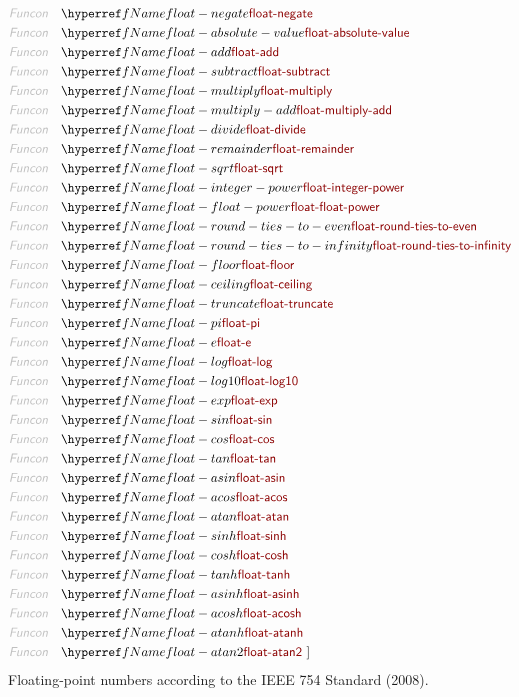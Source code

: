 \begin{align*}
  \KEY{Funcon} \quad & \NAMEREF{float-negate} \\
  \KEY{Funcon} \quad & \NAMEREF{float-absolute-value} \\
  \KEY{Funcon} \quad & \NAMEREF{float-add} \\
  \KEY{Funcon} \quad & \NAMEREF{float-subtract} \\
  \KEY{Funcon} \quad & \NAMEREF{float-multiply} \\
  \KEY{Funcon} \quad & \NAMEREF{float-multiply-add} \\
  \KEY{Funcon} \quad & \NAMEREF{float-divide} \\
  \KEY{Funcon} \quad & \NAMEREF{float-remainder} \\
  \KEY{Funcon} \quad & \NAMEREF{float-sqrt} \\
  \KEY{Funcon} \quad & \NAMEREF{float-integer-power} \\
  \KEY{Funcon} \quad & \NAMEREF{float-float-power} \\
  \KEY{Funcon} \quad & \NAMEREF{float-round-ties-to-even} \\
  \KEY{Funcon} \quad & \NAMEREF{float-round-ties-to-infinity} \\
  \KEY{Funcon} \quad & \NAMEREF{float-floor} \\
  \KEY{Funcon} \quad & \NAMEREF{float-ceiling} \\
  \KEY{Funcon} \quad & \NAMEREF{float-truncate} \\
  \KEY{Funcon} \quad & \NAMEREF{float-pi} \\
  \KEY{Funcon} \quad & \NAMEREF{float-e} \\
  \KEY{Funcon} \quad & \NAMEREF{float-log} \\
  \KEY{Funcon} \quad & \NAMEREF{float-log10} \\
  \KEY{Funcon} \quad & \NAMEREF{float-exp} \\
  \KEY{Funcon} \quad & \NAMEREF{float-sin} \\
  \KEY{Funcon} \quad & \NAMEREF{float-cos} \\
  \KEY{Funcon} \quad & \NAMEREF{float-tan} \\
  \KEY{Funcon} \quad & \NAMEREF{float-asin} \\
  \KEY{Funcon} \quad & \NAMEREF{float-acos} \\
  \KEY{Funcon} \quad & \NAMEREF{float-atan} \\
  \KEY{Funcon} \quad & \NAMEREF{float-sinh} \\
  \KEY{Funcon} \quad & \NAMEREF{float-cosh} \\
  \KEY{Funcon} \quad & \NAMEREF{float-tanh} \\
  \KEY{Funcon} \quad & \NAMEREF{float-asinh} \\
  \KEY{Funcon} \quad & \NAMEREF{float-acosh} \\
  \KEY{Funcon} \quad & \NAMEREF{float-atanh} \\
  \KEY{Funcon} \quad & \NAMEREF{float-atan2}
  \ ]
\end{align*}
Floating-point numbers according to the IEEE 754 Standard (2008).

